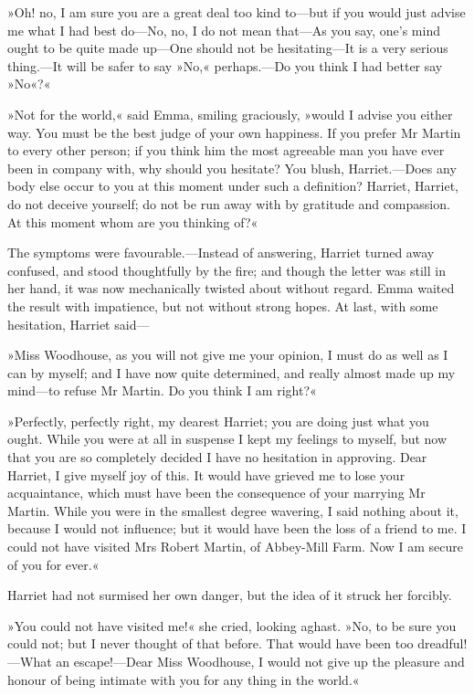 »Oh! no, I am sure you are a great deal too kind to—but if you would just advise me what I had best do—No, no, I do not mean that—As you say, one's mind ought to be quite made up—One should not be hesitating—It is a very serious thing.—It will be safer to say »No,« perhaps.—Do you think I had better say »No«?«

»Not for the world,« said Emma, smiling graciously, »would I advise you either way. You must be the best judge of your own happiness. If you prefer Mr Martin to every other person; if you think him the most agreeable man you have ever been in company with, why should you hesitate? You blush, Harriet.—Does any body else occur to you at this moment under such a definition? Harriet, Harriet, do not deceive yourself; do not be run away with by gratitude and compassion. At this moment whom are you thinking of?«

The symptoms were favourable.—Instead of answering, Harriet turned away confused, and stood thoughtfully by the fire; and though the letter was still in her hand, it was now mechanically twisted about without regard. Emma waited the result with impatience, but not without strong hopes. At last, with some hesitation, Harriet said—

»Miss Woodhouse, as you will not give me your opinion, I must do as well as I can by myself; and I have now quite determined, and really almost made up my mind—to refuse Mr Martin. Do you think I am right?«

»Perfectly, perfectly right, my dearest Harriet; you are doing just what you ought. While you were at all in suspense I kept my feelings to myself, but now that you are so completely decided I have no hesitation in approving. Dear Harriet, I give myself joy of this. It would have grieved me to lose your acquaintance, which must have been the consequence of your marrying Mr Martin. While you were in the smallest degree wavering, I said nothing about it, because I would not influence; but it would have been the loss of a friend to me. I could not have visited Mrs Robert Martin, of Abbey-Mill Farm. Now I am secure of you for ever.«

Harriet had not surmised her own danger, but the idea of it struck her forcibly.

»You could not have visited me!« she cried, looking aghast. »No, to be sure you could not; but I never thought of that before. That would have been too dreadful!—What an escape!—Dear Miss Woodhouse, I would not give up the pleasure and honour of being intimate with you for any thing in the world.«

